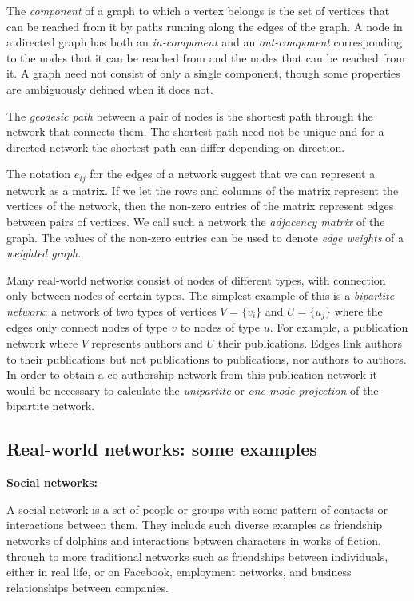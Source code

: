 \documentclass{article}
\begin{document}
The \emph{component} of a graph to which a vertex belongs is the set of vertices that can be reached from it by paths running along the edges of the graph. A node in a directed graph has both an \emph{in-component} and an \emph{out-component} corresponding to the nodes that it can be reached from and the nodes that can be reached from it. A graph need not consist of only a single component, though some properties are ambiguously defined when it does not.

The \emph{geodesic path} between a pair of nodes is the shortest path through the network that connects them. The shortest path need not be unique and for a directed network the shortest path can differ depending on direction.

The notation $e_{ij}$ for the edges of a network suggest that we can represent a network as a matrix. If we let the rows and columns of the matrix represent the vertices of the network, then the non-zero entries of the matrix represent edges between pairs of vertices. We call such a network the \emph{adjacency matrix} of the graph. The values of the non-zero entries can be used to denote \emph{edge weights} of a \emph{weighted graph}.

Many real-world networks consist of nodes of different types, with connection only between nodes of certain types. The simplest example of this is a \emph{bipartite network}: a network of two types of vertices $V=\{v_i\}$ and $U=\{u_j\}$ where the edges only connect nodes of type $v$ to nodes of type $u$. For example, a publication network where $V$ represents authors and $U$ their publications. Edges link authors to their publications but not publications to publications, nor authors to authors. In order to obtain a co-authorship network from this publication network it would be necessary to calculate the \emph{unipartite} or \emph{one-mode projection} of the bipartite network.


\subsection*{Real-world networks: some examples}

{\bf Social networks:} 

A social network is a set of people or groups with some pattern of contacts or interactions between them. They include such diverse examples as friendship networks of dolphins and interactions between characters in works of fiction, through to more traditional networks such as friendships between individuals, either in real life, or on Facebook, employment networks, and business relationships between companies.
\end{document}
